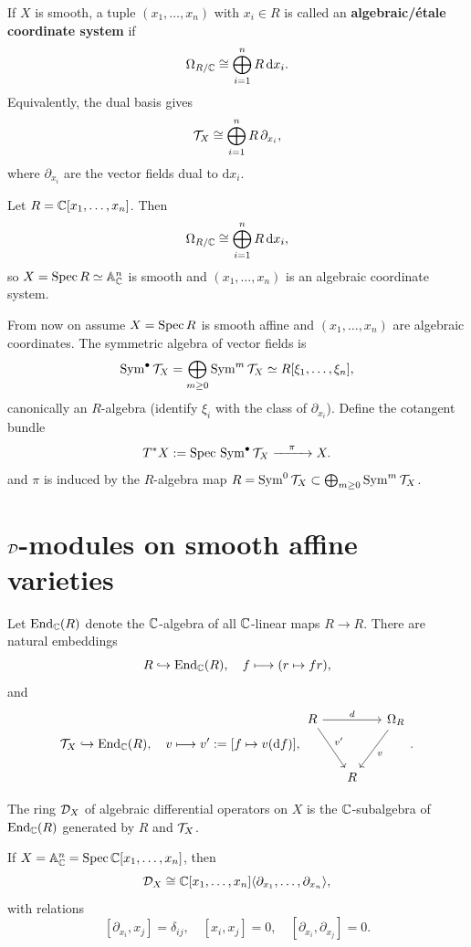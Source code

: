 If $X$ is smooth, a tuple $(x_1,\dots,x_n)$ with $x_i\in R$ is called an \textbf{algebraic/étale coordinate system} if
\[
    \Omega_{R/\mathbb{C}} \cong \bigoplus_{i=1}^n R\,\mathrm d x_i.
\]
Equivalently, the dual basis gives
\[
    \mathcal{T}_X \cong \bigoplus_{i=1}^n R\,\partial_{x_i},
\]
where $\partial_{x_i}$ are the vector fields dual to $\mathrm d x_i$.

\begin{example}
    Let $R=\mathbb{C}[x_1,\dots,x_n]$. Then
    \[
        \Omega_{R/\mathbb{C}} \cong \bigoplus_{i=1}^n R\,\mathrm d x_i,
    \]
    so $X=\operatorname{Spec} R\simeq \mathbb{A}^n_{\mathbb{C}}$ is smooth and $(x_1,\dots,x_n)$ is an algebraic coordinate system.
\end{example}

From now on assume $X=\operatorname{Spec} R$ is smooth affine and $(x_1,\dots,x_n)$ are algebraic coordinates.
The symmetric algebra of vector fields is
\[
    \operatorname{Sym}^{\bullet}\mathcal{T}_X = \bigoplus_{m\ge 0}\operatorname{Sym}^{m}\mathcal{T}_X \simeq R[\xi_1,\dots,\xi_n],
\]
canonically an $R$-algebra (identify $\xi_i$ with the class of $\partial_{x_i}$). Define the
cotangent bundle
\[
    T^{\ast}X := \operatorname{Spec}\, \operatorname{Sym}^{\bullet}\mathcal{T}_X \xrightarrow{\quad\pi\quad} X.
\]
and $\pi$ is induced by the $R$-algebra map $R = \operatorname{Sym}^{0}\mathcal{T}_X \subset \bigoplus_{m\ge 0}\operatorname{Sym}^{m}\mathcal{T}_X$.


\section{$\mathcal{D}$-modules on smooth affine varieties}
Let $\operatorname{End}_{\mathbb{C}}(R)$ denote the $\mathbb{C}$-algebra of all $\mathbb{C}$-linear maps $R\to R$. There are natural
embeddings
\[
    R\hookrightarrow \operatorname{End}_{\mathbb{C}}(R),\quad f\longmapsto (r\mapsto fr),
\]
and
\[
    \T_X\hookrightarrow \End_{\C}(R),\quad v\longmapsto v':=[f\mapsto v(\mathrm d f)],
    \begin{tikzcd}[row sep=3em, column sep=1.5em]
        R \arrow[rr, "d"] \arrow[dr, "v'"]  %
        & & \Omega_R \arrow[dl, "v"]       %
        \\
        & R &
    \end{tikzcd}.
\]

\begin{definition}
    The ring $\mathcal{D}_X$ of algebraic differential operators on $X$ is the $\mathbb{C}$-subalgebra of
    $\operatorname{End}_{\mathbb{C}}(R)$ generated by $R$ and $\mathcal{T}_X$.
\end{definition}

\begin{example}
    If $X=\mathbb{A}^n_{\mathbb{C}}=\operatorname{Spec} \mathbb{C}[x_1,\dots,x_n]$, then
    \[
        \mathcal{D}_X \cong \mathbb{C}[x_1,\dots,x_n]\langle \partial_{x_1},\dots,\partial_{x_n}\rangle,
    \]
    with relations
    \[
        [\partial_{x_i},x_j]=\delta_{ij},\quad [x_i,x_j]=0,\quad [\partial_{x_i},\partial_{x_j}]=0.
    \]
\end{example}

